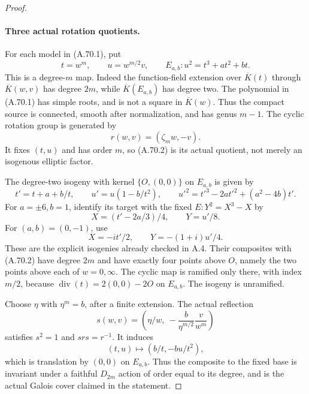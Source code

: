 \begin{proof}
\paragraph{Three actual rotation quotients.}
For each model in (A.70.1), put
\[
 t=w^m,\qquad u=w^{m/2}v,\qquad
 E_{a,b}:u^2=t^3+at^2+bt.                         \tag{A.70.2}
\]
This is a degree-\(m\) map. Indeed the function-field extension
over \(\overline K(t)\) through \(\overline K(w,v)\) has
degree \(2m\), while \(\overline K(E_{a,b})\) has degree two.
The polynomial in (A.70.1) has simple roots, and is not a square
in \(\overline K(w)\). Thus the compact source is connected,
smooth after normalization, and has genus \(m-1\).
The cyclic rotation group is generated by
\[
                 r(w,v)=(\zeta_mw,-v).            \tag{A.70.3}
\]
It fixes \((t,u)\) and has order \(m\), so (A.70.2) is its
actual quotient, not merely an isogenous elliptic factor.

The degree-two isogeny with kernel \(\{O,(0,0)\}\) on
\(E_{a,b}\) is given by
\[
 t'=t+a+b/t,\qquad u'=u(1-b/t^2),\qquad
 u'^2=t'^3-2at'^2+(a^2-4b)t'.                    \tag{A.70.4}
\]
For \(a=\pm6,b=1\), identify its target with the fixed
\(E:Y^2=X^3-X\) by
\[
                  X=(t'-2a/3)/4,\qquad Y=u'/8.
                                                               \tag{A.70.5}
\]
For \((a,b)=(0,-1)\), use
\[
                  X=-it'/2,\qquad Y=-(1+i)u'/4.
                                                               \tag{A.70.6}
\]
These are the explicit isogenies already checked in A.4. Their
composites with (A.70.2) have degree \(2m\) and have exactly
four points above \(O\), namely the two points above each of
\(w=0,\infty\). The cyclic map is ramified only there, with
index \(m/2\), because \(\operatorname{div}(t)=2(0,0)-2O\)
on \(E_{a,b}\). The isogeny is unramified.

Choose \(\eta\) with \(\eta^m=b\), after a finite extension.
The actual reflection
\[
 s(w,v)=\left(\eta/w,\ -\frac{b}{\eta^{m/2}}\frac v{w^m}\right)
                                                               \tag{A.70.7}
\]
satisfies \(s^2=1\) and \(srs=r^{-1}\). It induces
\[
                   (t,u)\longmapsto(b/t,-bu/t^2),
                                                               \tag{A.70.8}
\]
which is translation by \((0,0)\) on \(E_{a,b}\).
Thus the composite to the fixed base is invariant under a faithful
\(D_{2m}\) action of order equal to its degree, and is the actual
Galois cover claimed in the statement.


\end{proof}
